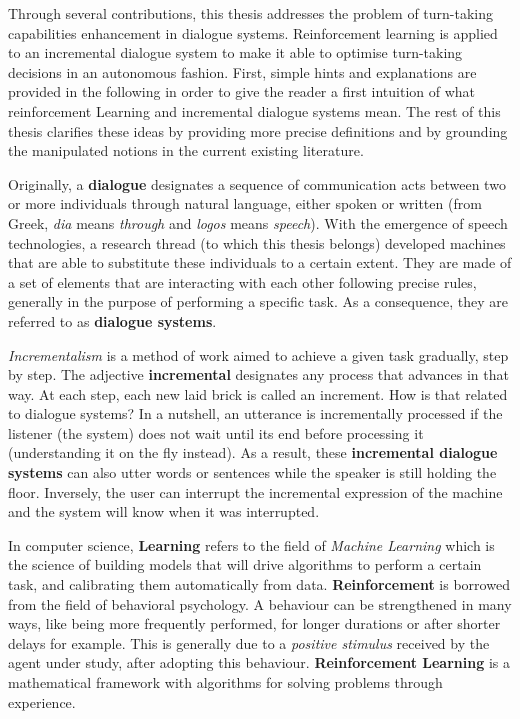 				Through several contributions, this thesis addresses the problem of turn-taking capabilities enhancement in dialogue systems. Reinforcement learning is applied to an incremental dialogue system to make it able to optimise turn-taking decisions in an autonomous fashion. First, simple hints and explanations are provided in the following in order to give the reader a first intuition of what reinforcement Learning and incremental dialogue systems mean. The rest of this thesis clarifies these ideas by providing more precise definitions and by grounding the manipulated notions in the current existing literature.

        Originally, a \textbf{dialogue} designates a sequence of communication acts between two or more individuals through natural language, either spoken or written (from Greek, \textit{dia} means \textit{through} and \textit{logos} means \textit{speech}). With the emergence of speech technologies, a research thread (to which this thesis belongs) developed machines that are able to substitute these individuals to a certain extent. They are made of a set of elements that are interacting with each other following precise rules, generally in the purpose of performing a specific task. As a consequence, they are referred to as \textbf{dialogue systems}.

        \textit{Incrementalism} is a method of work aimed to achieve a given task gradually, step by step. The adjective \textbf{incremental} designates any process that advances in that way. At each step, each new laid brick is called an increment. How is that related to dialogue systems? In a nutshell, an utterance is incrementally processed if the listener (the system) does not wait until its end before processing it (understanding it on the fly instead). As a result, these \textbf{incremental dialogue systems} can also utter words or sentences while the speaker is still holding the floor. Inversely, the user can interrupt the incremental expression of the machine and the system will know when it was interrupted.

        In computer science, \textbf{Learning} refers to the field of \textit{Machine Learning} which is the science of building models that will drive algorithms to perform a certain task, and calibrating them automatically from data. \textbf{Reinforcement} is borrowed from the field of behavioral psychology. A behaviour can be strengthened in many ways, like being more frequently performed, for longer durations or after shorter delays for example. This is generally due to a \textit{positive stimulus} received by the agent under study, after adopting this behaviour. \textbf{Reinforcement Learning} is a mathematical framework with algorithms for solving problems through experience.


